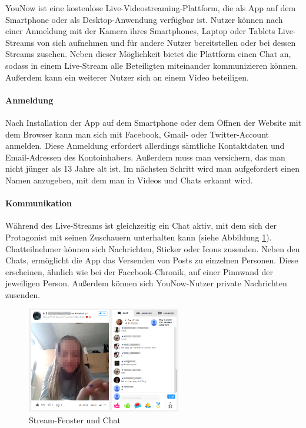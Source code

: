 YouNow ist eine kostenlose Live-Videostreaming-Plattform, die als App auf dem
Smartphone oder als Desktop-Anwendung verfügbar ist. Nutzer können nach einer
Anmeldung mit der Kamera ihres Smartphones, Laptop oder Tablets Live-Streams
von sich aufnehmen und für andere Nutzer bereitstellen oder bei dessen Streams
zusehen. Neben dieser Möglichkeit bietet die Plattform einen Chat an, sodass in
einem Live-Stream alle Beteiligten miteinander kommunizieren können. Außerdem
kann ein weiterer Nutzer sich an einem Video beteiligen.

\paragraph{Anmeldung}
Nach Installation der App auf dem Smartphone oder dem Öffnen der Website mit dem Browser kann man sich mit Facebook, Gmail- oder Twitter-Account anmelden. Diese Anmeldung erfordert allerdings sämtliche Kontaktdaten und Email-Adressen des Kontoinhabers. Außerdem muss man versichern, das man nicht jünger als 13 Jahre alt ist.
Im nächsten Schritt wird man aufgefordert einen Namen anzugeben, mit dem man in Videos und Chats erkannt wird.

\paragraph{Kommunikation}
Während des Live-Streams ist gleichzeitig ein Chat aktiv, mit dem sich der Protagonist mit seinen Zuschauern unterhalten kann (siehe Abbildung \ref{stream_with_chat}). Chatteilnehmer können sich Nachrichten, Sticker oder Icons zusenden. Neben den Chats, ermöglicht die App das Versenden von Posts zu einzelnen Personen. Diese erscheinen, ähnlich wie bei der Facebook-Chronik, auf einer Pinnwand der jeweiligen Person. Außerdem können sich YouNow-Nutzer private Nachrichten zusenden.

\begin{figure}[!ht]
\centering
\includegraphics[width=0.6\textwidth]{./resources/younow_stream_with_chat}
\caption{Stream-Fenster und Chat}
\label{stream_with_chat}
\end{figure} 

